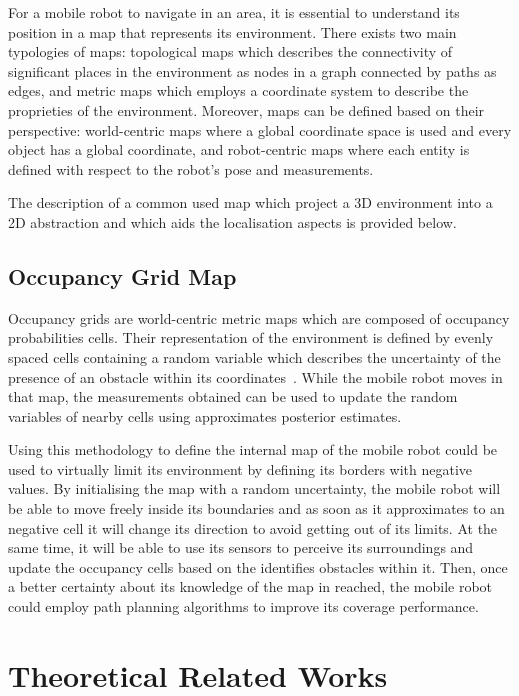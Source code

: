 \noindent For a mobile robot to navigate in an area, it is essential to understand its position in a map that represents its environment.
There exists two main typologies of maps: topological maps which describes the connectivity
of significant places in the environment as nodes in a graph connected by paths as edges, and metric maps which employs a coordinate system to describe the proprieties of the environment.
Moreover, maps can be defined based on their perspective: world-centric maps where a global coordinate space is used and every object has a global coordinate, and robot-centric maps where each entity is defined with respect to the robot's pose and measurements.

The description of a common used map which project a \gls{3D} environment into a \gls{2D} abstraction and which aids the localisation aspects is provided below.

\subsection{Occupancy Grid Map}
\noindent Occupancy grids are world-centric metric maps which are composed of occupancy probabilities cells.
Their representation of the environment is defined by evenly spaced cells containing a random variable which describes the uncertainty of the presence of an obstacle within its coordinates~\cite{thrun_probabilistic_2005}.
While the mobile robot moves in that map, the measurements obtained can be used to update the random variables of nearby cells using approximates posterior estimates.

Using this methodology to define the internal map of the mobile robot could be used to virtually limit its environment by defining its borders with negative values.
By initialising the map with a random uncertainty, the mobile robot will be able to move freely inside its boundaries and as soon as it approximates to an negative cell it will change its direction to avoid getting out of its limits.
At the same time, it will be able to use its sensors to perceive its surroundings and update the occupancy cells based on the identifies obstacles within it.
Then, once a better certainty about its knowledge of the map in reached, the mobile robot could employ path planning algorithms to improve its coverage performance.




\section{Theoretical Related Works}

